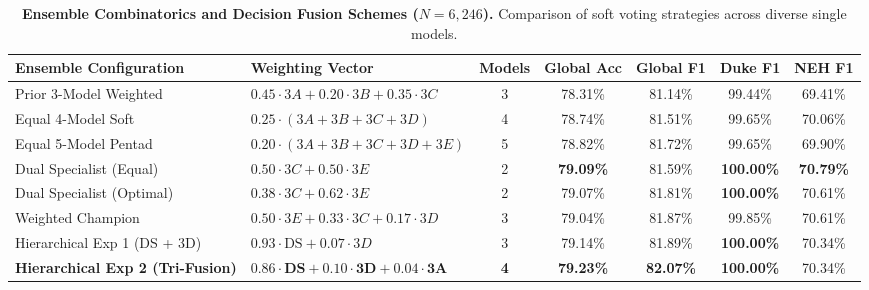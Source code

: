 \documentclass{article}
\begin{document}
\begin{table}[t]
\centering
\small
\caption{\textbf{Ensemble Combinatorics and Decision Fusion Schemes ($N = 6,246$).} Comparison of soft voting strategies across diverse single models.}
\label{tab:ensemble_schemes}
\begin{tabular}{llccccc}
\toprule
\textbf{Ensemble Configuration} & \textbf{Weighting Vector} & \textbf{Models} & \textbf{Global Acc} & \textbf{Global F1} & \textbf{Duke F1} & \textbf{NEH F1} \\
\midrule
Prior 3-Model Weighted & $0.45 \cdot 3A + 0.20 \cdot 3B + 0.35 \cdot 3C$ & 3 & 78.31\% & 81.14\% & 99.44\% & 69.41\% \\
Equal 4-Model Soft & $0.25 \cdot (3A + 3B + 3C + 3D)$ & 4 & 78.74\% & 81.51\% & 99.65\% & 70.06\% \\
Equal 5-Model Pentad & $0.20 \cdot (3A + 3B + 3C + 3D + 3E)$ & 5 & 78.82\% & 81.72\% & 99.65\% & 69.90\% \\
Dual Specialist (Equal) & $0.50 \cdot 3C + 0.50 \cdot 3E$ & 2 & \textbf{79.09\%} & 81.59\% & \textbf{100.00\%} & \textbf{70.79\%} \\
Dual Specialist (Optimal) & $0.38 \cdot 3C + 0.62 \cdot 3E$ & 2 & 79.07\% & 81.81\% & \textbf{100.00\%} & 70.61\% \\
Weighted Champion & $0.50 \cdot 3E + 0.33 \cdot 3C + 0.17 \cdot 3D$ & 3 & 79.04\% & 81.87\% & 99.85\% & 70.61\% \\
Hierarchical Exp 1 (DS + 3D) & $0.93 \cdot \text{DS} + 0.07 \cdot 3D$ & 3 & 79.14\% & 81.89\% & \textbf{100.00\%} & 70.34\% \\
\textbf{Hierarchical Exp 2 (Tri-Fusion)} & $\mathbf{0.86 \cdot \text{DS} + 0.10 \cdot 3D + 0.04 \cdot 3A}$ & \textbf{4} & \textbf{79.23\%} & \textbf{82.07\%} & \textbf{100.00\%} & 70.34\% \\
\bottomrule
\end{tabular}
\end{table}
\end{document}
